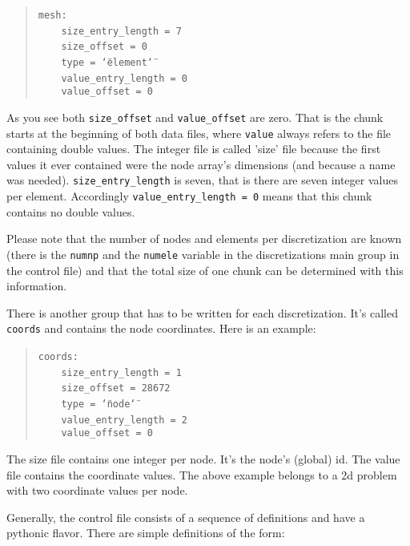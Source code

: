 \begin{quote}
\texttt{mesh:~}~\\
 \texttt{~~~~size{\_}entry{\_}length~=~7~}~\\
 \texttt{~~~~size{\_}offset~=~0~}~\\
 \texttt{~~~~type~=~\char`\"{}element\char`\"{}~}~\\
 \texttt{~~~~value{\_}entry{\_}length~=~0~}~\\
 \texttt{~~~~value{\_}offset~=~0 }
\end{quote}
As you see both \texttt{size{\_}offset} and \texttt{value{\_}offset}
are zero. That is the chunk starts at the beginning of both data files,
where \texttt{value} always refers to the file containing double values.
The integer file is called 'size' file because the first values it
ever contained were the node array's dimensions (and because a name
was needed). \texttt{size{\_}entry{\_}length} is seven, that is
there are seven integer values per element. Accordingly \texttt{value{\_}entry{\_}length
= 0} means that this chunk contains no double values.

Please note that the number of nodes and elements per discretization
are known (there is the \texttt{numnp} and the \texttt{numele} variable
in the discretizations main group in the control file) and that the
total size of one chunk can be determined with this information.

There is another group that has to be written for each discretization.
It's called \texttt{coords} and contains the node coordinates. Here
is an example: 

\begin{quote}
\texttt{coords:~}~\\
 \texttt{~~~~size{\_}entry{\_}length~=~1~}~\\
 \texttt{~~~~size{\_}offset~=~28672~}~\\
 \texttt{~~~~type~=~\char`\"{}node\char`\"{}~}~\\
 \texttt{~~~~value{\_}entry{\_}length~=~2~}~\\
 \texttt{~~~~value{\_}offset~=~0 }
\end{quote}
The size file contains one integer per node. It's the node's (global)
id. The value file contains the coordinate values. The above example
belongs to a 2d problem with two coordinate values per node.

Generally, the control file consists of a sequence of definitions
and have a pythonic flavor. There are simple definitions of the form: 

